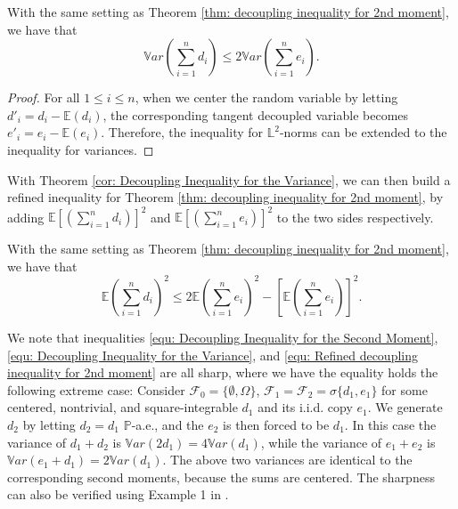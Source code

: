 \documentclass[ECP]{ejpecp} %
\newcommand{\F}{\mathcal{F}}
\newcommand{\lpar}{\left(}
\newcommand{\rpar}{\right)}
\newcommand{\lbr}{\left[}
\newcommand{\rbr}{\right]}
\newcommand{\pro}{\mathbb{P}}
\newcommand{\E}{\mathbb{E}}
\newcommand{\sumn}{\sum\limits_{i=1}^n}
\newcommand{\var}{\mathbb{V}ar}
\begin{document}
\begin{theorem}
    \label{cor: Decoupling Inequality for the Variance}
    With the same setting as Theorem \ref{thm: decoupling inequality for 2nd moment}, we have that
    \begin{equation}
        \label{equ: Decoupling Inequality for the Variance}
        \var \lpar \sumn d_i\rpar \leq 2 \var \lpar \sumn e_i\rpar.
    \end{equation}
\end{theorem}

\begin{proof}
    For all $1\leq i\leq n$, when we center the random variable by letting $d'_i = d_i-\E(d_i)$, the corresponding tangent decoupled variable becomes $e'_i = e_i-\E(e_i)$. Therefore, the inequality for $\mathbb{L}^2$-norms can be extended to the inequality for variances.
\end{proof}

With Theorem \ref{cor: Decoupling Inequality for the Variance}, we can then build a refined inequality for Theorem \ref{thm: decoupling inequality for 2nd moment}, by adding $\E[(\sumn d_i)]^2$ and $\E[(\sumn e_i)]^2$ to the two sides respectively.

\begin{theorem}
    \label{cor: Refined decoupling inequality for 2nd moment}
    With the same setting as Theorem \ref{thm: decoupling inequality for 2nd moment}, we have that 
    \begin{equation}
        \label{equ: Refined decoupling inequality for 2nd moment}
        \E \lpar \sumn d_i\rpar^2 \leq 2 \E \lpar \sumn e_i\rpar^2 -\lbr  \E\lpar \sumn e_i\rpar \rbr^2.
    \end{equation}
\end{theorem}

\begin{remark}
    We note that inequalities \eqref{equ: Decoupling Inequality for the Second Moment}, \eqref{equ: Decoupling Inequality for the Variance}, and \eqref{equ: Refined decoupling inequality for 2nd moment} are all sharp, where we have the equality holds the following extreme case: Consider $\F_0 =\{\emptyset ,\Omega\}$, $\F_1 = \F_2 = \sigma \{d_1, e_1\}$ for some centered, nontrivial, and square-integrable $d_1$ and its i.i.d. copy $e_1$. We generate $d_2$ by letting $d_2 = d_1$ $\pro$-a.e., and the $e_2$ is then forced to be $d_1$. In this case the variance of $d_1+d_2$ is $\var (2d_1) = 4\var (d_1)$, while the variance of $e_1+e_2$ is $\var (e_1+d_1) = 2\var (d_1)$.
    The above two variances are identical to the corresponding second moments, because the sums are centered. The sharpness can also be verified using Example 1 in \cite{de1992note}.
\end{remark}
\end{document}
